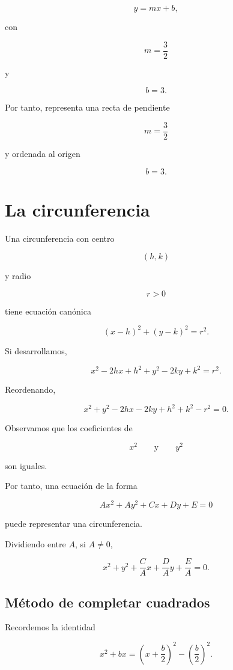 \documentclass[12pt]{article}
\theoremstyle{plain}
\theoremstyle{definition}
\theoremstyle{remark}
\begin{document}
{\[
y=mx+b,
\]

con

\[
m=\frac32
\]

y

\[
b=3.
\]

Por tanto, representa una recta de pendiente

\[
\boxed{m=\frac32}
\]

y ordenada al origen

\[
\boxed{b=3}.
\]

\section*{La circunferencia}

Una circunferencia con centro

\[
(h,k)
\]

y radio

\[
r>0
\]

tiene ecuación canónica

\[
\boxed{
(x-h)^2+(y-k)^2=r^2.
}
\]

Si desarrollamos,

\[
x^2-2hx+h^2+y^2-2ky+k^2=r^2.
\]

Reordenando,

\[
x^2+y^2-2hx-2ky+h^2+k^2-r^2=0.
\]

Observamos que los coeficientes de

\[
x^2
\qquad\text{y}\qquad
y^2
\]

son iguales.

Por tanto, una ecuación de la forma

\[
Ax^2+Ay^2+Cx+Dy+E=0
\]

puede representar una circunferencia.

Dividiendo entre \(A\), si \(A\neq0\),

\[
x^2+y^2+\frac{C}{A}x+\frac{D}{A}y+\frac{E}{A}=0.
\]

\subsection*{Método de completar cuadrados}

Recordemos la identidad

\[
x^2+bx
=
\left(x+\frac{b}{2}\right)^2
-
\left(\frac{b}{2}\right)^2.
\]

}
\end{document}
